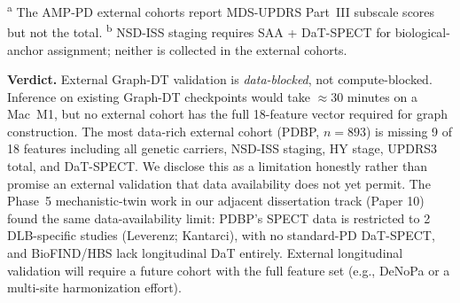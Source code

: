\documentclass[11pt]{article}
\begin{document}
\noindent \textsuperscript{a} The AMP-PD external cohorts report MDS-UPDRS Part~III subscale scores but not the total. \textsuperscript{b} NSD-ISS staging requires SAA + DaT-SPECT for biological-anchor assignment; neither is collected in the external cohorts.

\noindent \textbf{Verdict.} External Graph-DT validation is \emph{data-blocked}, not compute-blocked. Inference on existing Graph-DT checkpoints would take $\approx 30$ minutes on a Mac~M1, but no external cohort has the full 18-feature vector required for graph construction. The most data-rich external cohort (PDBP, $n{=}893$) is missing 9 of 18 features including all genetic carriers, NSD-ISS staging, HY stage, UPDRS3 total, and DaT-SPECT. We disclose this as a limitation honestly rather than promise an external validation that data availability does not yet permit. The Phase~5 mechanistic-twin work in our adjacent dissertation track (Paper 10) found the same data-availability limit: PDBP's SPECT data is restricted to 2 DLB-specific studies (Leverenz; Kantarci), with no standard-PD DaT-SPECT, and BioFIND/HBS lack longitudinal DaT entirely. External longitudinal validation will require a future cohort with the full feature set (e.g., DeNoPa or a multi-site harmonization effort).
\end{document}
